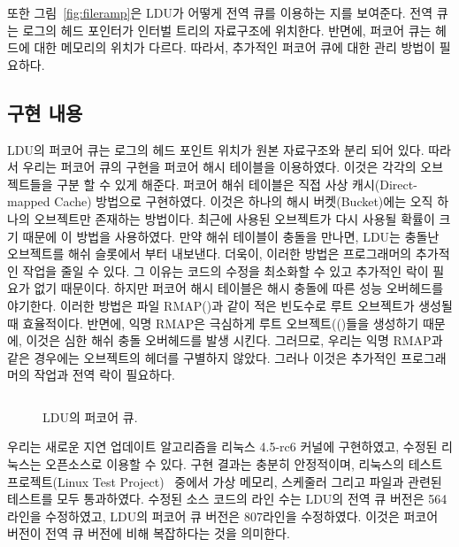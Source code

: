 또한 그림~\ref{fig:fileramp}은 LDU가 어떻게 전역 큐를 이용하는 지를 보여준다. 
전역 큐는 로그의 헤드 포인터가 인터벌 트리의 자료구조에 위치한다.
반면에, 퍼코어 큐는 헤드에 대한 메모리의 위치가 다르다. 
따라서, 추가적인 퍼코어 큐에 대한 관리 방법이 필요하다.

\subsection{구현 내용}
LDU의 퍼코어 큐는 로그의 헤드 포인트 위치가 원본 자료구조와 분리 되어 있다.
따라서 우리는 퍼코어 큐의 구현을 퍼코어 해시 테이블을 이용하였다. 
이것은 각각의 오브젝트들을 구분 할 수 있게 해준다.
퍼코어 해쉬 테이블은 직접 사상 캐시(Direct-mapped Cache) 방법으로 구현하였다. 
이것은 하나의 해시 버켓(Bucket)에는 오직 하나의 오브젝트만 존재하는 방법이다.
최근에 사용된 오브젝트가 다시 사용될 확률이 크기 때문에 이 방법을 사용하였다.
만약 해쉬 테이블이 충돌을 만나면, LDU는 충돌난 오브젝트를 해쉬 슬롯에서 부터 내보낸다.
더욱이, 이러한 방법은 프로그래머의 추가적인 작업을 줄일 수 있다. 
그 이유는 코드의 수정을 최소화할 수 있고 추가적인 락이 필요가 없기 때문이다.
하지만 퍼코어 해시 테이블은 해시 충돌에 따른 성능 오버헤드를 야기한다.
이러한 방법은 파일 RMAP()과 같이 적은 빈도수로 루트 
오브젝트가 생성될 때 효율적이다. 
반면에, 익명 RMAP은 극심하게 루트 오브젝트(()들을 생성하기 때문에, 
이것은 심한 해쉬 충돌 오버헤드를 발생 시킨다.
그러므로, 우리는 익명 RMAP과 같은 경우에는 오브젝트의 헤더를 구별하지 않았다. 
그러나 이것은 추가적인 프로그래머의 작업과 전역 락이 필요하다.

\begin{figure}[h!]
\begin{center}
\inputminted[linenos,fontsize=\footnotesize,
tabsize=4]{c}{src/ldu_queue_per_core.c}
\end{center}
\caption{LDU의 퍼코어 큐.}
\label{fig:glduphysicalupdate}
\end{figure}

우리는 새로운 지연 업데이트 알고리즘을 리눅스 4.5-rc6 커널에 구현하였고, 
수정된 리눅스는 오픈소스로 이용할 수 있다.  
구현 결과는 충분히 안정적이며, 리눅스의 테스트 
프로젝트(Linux Test Project)~\cite{LTP} 중에서 가상 메모리, 스케줄러 그리고 
파일과 관련된 테스트를 모두 통과하였다. 
수정된 소스 코드의 라인 수는 LDU의 전역 큐 버전은 564라인을 수정하였고, 
LDU의 퍼코어 큐 버전은 807라인을 수정하였다. 
이것은 퍼코어 버전이 전역 큐 버전에 비해 복잡하다는 것을 의미한다.


